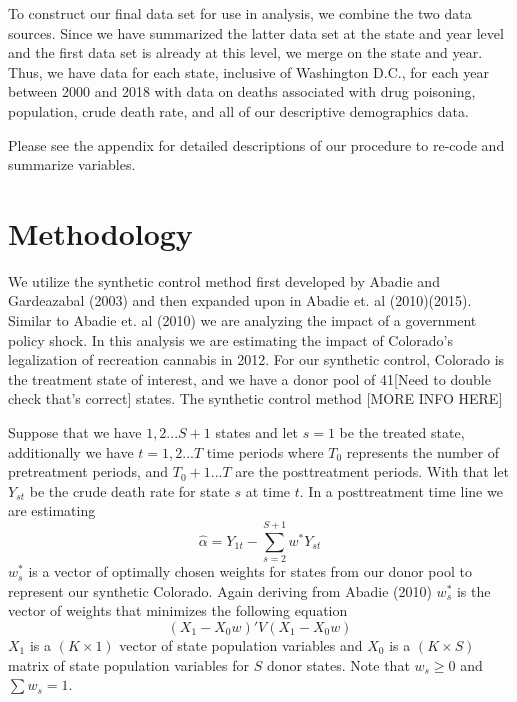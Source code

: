 \documentclass{article}
\begin{document}
To construct our final data set for use in analysis, we combine the two data sources. Since we have summarized the latter data set at the state and year level and the first data set is already at this level, we merge on the state and year. Thus, we have data for each state, inclusive of Washington D.C., for each year between 2000 and 2018 with data on deaths associated with drug poisoning, population, crude death rate, and all of our descriptive demographics data.



Please see the appendix for detailed descriptions of our procedure to re-code and summarize variables.

\section{Methodology}
We utilize the synthetic control method first developed by Abadie and Gardeazabal (2003) and then expanded upon in Abadie et. al (2010)(2015). Similar to Abadie et. al (2010) we are analyzing the impact of a government policy shock. In this analysis we are estimating the impact of Colorado's legalization of recreation cannabis in 2012. For our synthetic control, Colorado is the treatment state of interest, and we have a donor pool of 41[Need to double check that's correct] states. The synthetic control method [MORE INFO HERE]

Suppose that we have $1,2...S+1$ states and let $s = 1$ be the treated state, additionally we have $t = 1,2...T$ time periods where $T_0$ represents the number of pretreatment periods, and $T_0 + 1...T$ are the posttreatment periods. With that let $Y_{st}$ be the crude death rate for state $s$ at time $t$. In a posttreatment time line we are estimating
\begin{equation*}
\hat{\alpha} = Y_{1t} - \sum_{s=2}^{S+1}w^{*}Y_{st}
\end{equation*}
$w^{*}_s$ is a vector of optimally chosen weights for states from our donor pool to represent our synthetic Colorado. Again deriving from Abadie (2010) $w^{*}_s$ is the vector of weights that minimizes the following equation
\begin{equation*}
(X_1 - X_0w)'V(X_1 - X_0w)
\end{equation*}
$X_1$ is a $(K \times 1)$ vector of state population variables and $X_0$ is a $(K \times S)$ matrix of state population variables for $S$ donor states. Note that $w_s \geq 0$ and $\sum w_s = 1$.
\end{document}
